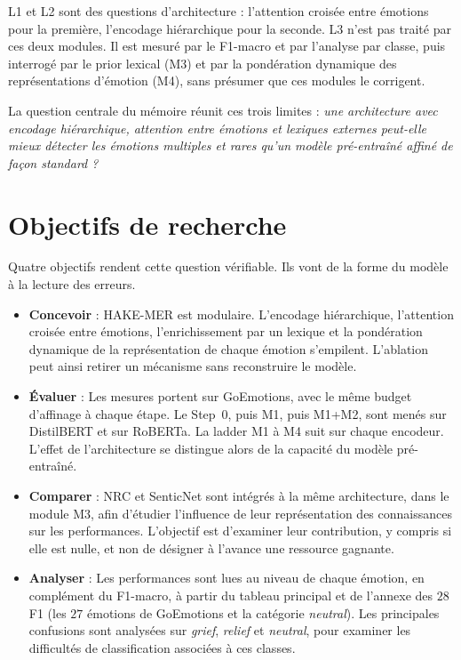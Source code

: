 L1 et L2 sont des questions d'architecture : l'attention croisée entre
émotions pour la première, l'encodage hiérarchique pour la seconde. L3
n'est pas traité par ces deux modules. Il est mesuré par le F1-macro et
par l'analyse par classe, puis interrogé par le prior lexical (M3) et
par la pondération dynamique des représentations d'émotion (M4), sans
présumer que ces modules le corrigent.

La question centrale du mémoire réunit ces trois limites :
\textit{une architecture avec encodage hiérarchique, attention entre
émotions et lexiques externes peut-elle mieux détecter les émotions
multiples et rares qu'un modèle pré-entraîné affiné de façon standard ?}

\section{Objectifs de recherche}
\label{sec:objectifs}

Quatre objectifs rendent cette question vérifiable. Ils vont de la forme
du modèle à la lecture des erreurs.

\begin{itemize}
\item \textbf{Concevoir} : HAKE-MER est modulaire. L'encodage hiérarchique,
  l'attention croisée entre émotions, l'enrichissement par un lexique et
  la pondération dynamique de la représentation de chaque émotion
  s'empilent. L'ablation peut ainsi retirer un
  mécanisme sans reconstruire le modèle.
\item \textbf{Évaluer} : Les mesures portent sur GoEmotions, avec le même
  budget d'affinage à chaque étape. Le Step~0, puis M1, puis M1+M2, sont
  menés sur DistilBERT et sur RoBERTa. La ladder M1 à M4 suit sur chaque
  encodeur. L'effet de l'architecture se distingue alors de la capacité
  du modèle pré-entraîné.
\item \textbf{Comparer} : NRC et SenticNet sont intégrés à la même
  architecture, dans le module M3, afin d'étudier l'influence de leur
  représentation des connaissances sur les performances. L'objectif est
  d'examiner leur contribution, y compris si elle est nulle, et non de
  désigner à l'avance une ressource gagnante.
\item \textbf{Analyser} : Les performances sont lues au niveau de chaque
  émotion, en complément du F1-macro, à partir du tableau principal et
  de l'annexe des $28$ F1 (les $27$ émotions de GoEmotions et la
  catégorie \emph{neutral}). Les principales confusions sont analysées
  sur \emph{grief}, \emph{relief} et \emph{neutral}, pour examiner les
  difficultés de classification associées à ces classes.
\end{itemize}

